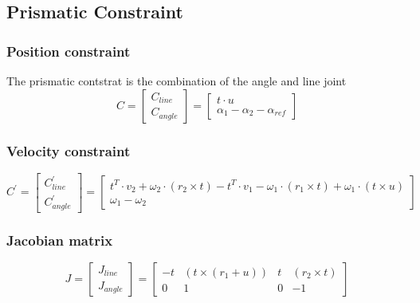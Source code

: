\documentclass{article}
\begin{document}
	\subsection{Prismatic Constraint}
	\subsubsection{Position constraint}
	The prismatic contstrat is the combination of the angle and line joint
		$$
			C=
			\begin{bmatrix}
				C_{line}\\
				C_{angle}
			\end{bmatrix}
			=
			\begin{bmatrix}
				t\cdot u\\
				\alpha_1-\alpha_2-\alpha_{ref}
			\end{bmatrix}
		$$
	\subsubsection{Velocity constraint}
		$$
			C^{'}=
			\begin{bmatrix}
				C_{line}^{'}\\
				C_{angle}^{'}
			\end{bmatrix}
			=
			\begin{bmatrix}
				t^T\cdot v_2+ \omega_2\cdot (r_2\times t)- t^T\cdot v_1-\omega_1\cdot (r_1\times t) + \omega_1\cdot(t\times u)\\
				\omega_1-\omega_2
			\end{bmatrix}
		$$
	\subsubsection{Jacobian matrix}
		$$
			J=
			\begin{bmatrix}
				J_{line}\\
				J_{angle}
			\end{bmatrix}
			=
			\begin{bmatrix}
				-t		& (t\times(r_1+u))		& t	& (r_2\times t)\\
				0		& 1						& 0	& -1
			\end{bmatrix}
		$$
\end{document}
